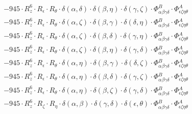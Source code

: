 \documentclass{article}
\begin{document}
\begin{equation}
\begin{array}{c}
 \\[0.2em] 		 - 945 \cdot R_{z}^{6} \cdot R_{\epsilon{}} \cdot R_{\theta{}} \cdot \delta{}\left(\alpha{}, \delta{}\right) \cdot \delta{}\left(\beta{}, \eta{}\right) \cdot \delta{}\left(\gamma{}, \zeta{}\right) \cdot \Phi{}^{B}_{\alpha{}\beta{}\gamma{}\delta{}} \cdot \Phi{}^{A}_{\epsilon{}\zeta{}\eta{}\theta{}} 
 \\[0.2em] 		 - 945 \cdot R_{z}^{6} \cdot R_{\epsilon{}} \cdot R_{\theta{}} \cdot \delta{}\left(\alpha{}, \zeta{}\right) \cdot \delta{}\left(\beta{}, \gamma{}\right) \cdot \delta{}\left(\delta{}, \eta{}\right) \cdot \Phi{}^{B}_{\alpha{}\beta{}\gamma{}\delta{}} \cdot \Phi{}^{A}_{\epsilon{}\zeta{}\eta{}\theta{}} 
 \\[0.2em] 		 - 945 \cdot R_{z}^{6} \cdot R_{\epsilon{}} \cdot R_{\theta{}} \cdot \delta{}\left(\alpha{}, \zeta{}\right) \cdot \delta{}\left(\beta{}, \delta{}\right) \cdot \delta{}\left(\gamma{}, \eta{}\right) \cdot \Phi{}^{B}_{\alpha{}\beta{}\gamma{}\delta{}} \cdot \Phi{}^{A}_{\epsilon{}\zeta{}\eta{}\theta{}} 
 \\[0.2em] 		 - 945 \cdot R_{z}^{6} \cdot R_{\epsilon{}} \cdot R_{\theta{}} \cdot \delta{}\left(\alpha{}, \zeta{}\right) \cdot \delta{}\left(\beta{}, \eta{}\right) \cdot \delta{}\left(\gamma{}, \delta{}\right) \cdot \Phi{}^{B}_{\alpha{}\beta{}\gamma{}\delta{}} \cdot \Phi{}^{A}_{\epsilon{}\zeta{}\eta{}\theta{}} 
 \\[0.2em] 		 - 945 \cdot R_{z}^{6} \cdot R_{\epsilon{}} \cdot R_{\theta{}} \cdot \delta{}\left(\alpha{}, \eta{}\right) \cdot \delta{}\left(\beta{}, \gamma{}\right) \cdot \delta{}\left(\delta{}, \zeta{}\right) \cdot \Phi{}^{B}_{\alpha{}\beta{}\gamma{}\delta{}} \cdot \Phi{}^{A}_{\epsilon{}\zeta{}\eta{}\theta{}} 
 \\[0.2em] 		 - 945 \cdot R_{z}^{6} \cdot R_{\epsilon{}} \cdot R_{\theta{}} \cdot \delta{}\left(\alpha{}, \eta{}\right) \cdot \delta{}\left(\beta{}, \delta{}\right) \cdot \delta{}\left(\gamma{}, \zeta{}\right) \cdot \Phi{}^{B}_{\alpha{}\beta{}\gamma{}\delta{}} \cdot \Phi{}^{A}_{\epsilon{}\zeta{}\eta{}\theta{}} 
 \\[0.2em] 		 - 945 \cdot R_{z}^{6} \cdot R_{\epsilon{}} \cdot R_{\theta{}} \cdot \delta{}\left(\alpha{}, \eta{}\right) \cdot \delta{}\left(\beta{}, \zeta{}\right) \cdot \delta{}\left(\gamma{}, \delta{}\right) \cdot \Phi{}^{B}_{\alpha{}\beta{}\gamma{}\delta{}} \cdot \Phi{}^{A}_{\epsilon{}\zeta{}\eta{}\theta{}} 
 \\[0.2em] 		 - 945 \cdot R_{z}^{6} \cdot R_{\zeta{}} \cdot R_{\eta{}} \cdot \delta{}\left(\alpha{}, \beta{}\right) \cdot \delta{}\left(\gamma{}, \delta{}\right) \cdot \delta{}\left(\epsilon{}, \theta{}\right) \cdot \Phi{}^{B}_{\alpha{}\beta{}\gamma{}\delta{}} \cdot \Phi{}^{A}_{\epsilon{}\zeta{}\eta{}\theta{}} 

\end{array}
\end{equation}
\end{document}

